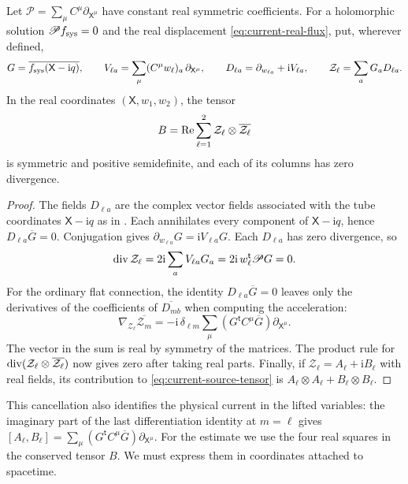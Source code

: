 \begin{lemma}\label{lem:current-flow}
Let $\mathscr P=\sum_\mu C^\mu\partial_{\mathsf X^\mu}$ have constant
real symmetric coefficients. For a holomorphic solution
$\mathscr P f_{\rm sys}=0$ and the real displacement
\eqref{eq:current-real-flux}, put, wherever defined,
\[
 G=\overline{f_{\rm sys}(\mathsf X-\mathrm i q)},\qquad
 V_{\ell a}=\sum_\mu(C^\mu w_\ell)_a\,\partial_{\mathsf X^\mu},\qquad
 D_{\ell a}=\partial_{w_{\ell a}}+\mathrm i V_{\ell a},\qquad
 \mathcal Z_\ell=\sum_a G_aD_{\ell a}.
\]
In the real coordinates $(\mathsf X,w_1,w_2)$, the tensor
\begin{equation}\label{eq:current-source-tensor}
 B=\operatorname{Re}\sum_{\ell=1}^2\mathcal Z_\ell\otimes\overline{\mathcal Z_\ell}
\end{equation}
is symmetric and positive semidefinite, and each of its columns has
zero divergence.
\end{lemma}

\begin{proof}
The fields $D_{\ell a}$ are the complex vector fields associated
with the tube coordinates $\mathsf X-\mathrm i q$ as in
\cite[Section~1]{BaouendiTreves1982}. Each annihilates every
component of $\mathsf X-\mathrm i q$, hence
$D_{\ell a}\overline G=0$. Conjugation gives
$\partial_{w_{\ell a}}G=\mathrm i V_{\ell a}G$.
Each $D_{\ell a}$ has zero divergence, so
\[
 \operatorname{div}\mathcal Z_\ell=2\mathrm i\sum_a V_{\ell a}G_a
       =2\mathrm i\, w_\ell^{\mathsf t}\mathscr P G=0 .
\]
For the ordinary flat connection, the identity $D_{\ell a}\overline G=0$
leaves only the derivatives of the coefficients of $\overline{D_{mb}}$
when computing the acceleration:
\[
 \nabla_{\mathcal Z_\ell}\overline{\mathcal Z_m}
 =-\mathrm i\,\delta_{\ell m}
       \sum_\mu(G^{\mathsf t}C^\mu\overline G)\partial_{\mathsf X^\mu}.
\]
The vector in the sum is real by symmetry of the matrices. The
product rule for $\operatorname{div}(\mathcal Z_\ell\otimes\overline{\mathcal Z_\ell})$
now gives zero after taking real parts. Finally, if
$\mathcal Z_\ell=A_\ell+\mathrm i B_\ell$ with real fields, its
contribution to \eqref{eq:current-source-tensor} is
$A_\ell\otimes A_\ell+B_\ell\otimes B_\ell$.
\end{proof}

This cancellation also identifies the physical current in the lifted
variables: the imaginary part of the last differentiation identity at
$m=\ell$ gives
$[A_\ell,B_\ell]=\sum_\mu(G^{\mathsf t}C^\mu\overline G)
\partial_{\mathsf X^\mu}$.
For the estimate we use the four real squares in the conserved tensor
$B$. We must express them in coordinates attached to spacetime.

